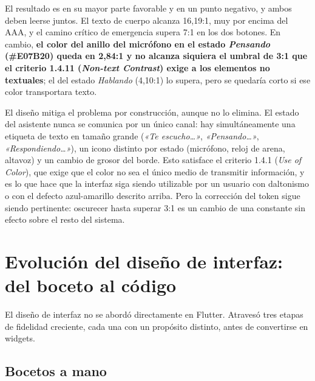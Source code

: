 El resultado es en su mayor parte favorable y en un punto negativo, y ambos deben leerse juntos. El texto
de cuerpo alcanza 16{,}19:1, muy por encima del AAA, y el camino crítico de emergencia supera 7:1 en los
dos botones. En cambio, \textbf{el color del anillo del micrófono en el estado \emph{Pensando}
(\#E07B20) queda en 2{,}84:1 y no alcanza siquiera el umbral de 3:1 que el criterio 1.4.11
(\emph{Non-text Contrast}) exige a los elementos no textuales}; el del estado \emph{Hablando} (4{,}10:1)
lo supera, pero se quedaría corto si ese color transportara texto.

El diseño mitiga el problema por construcción, aunque no lo elimina. El estado del asistente nunca se
comunica por un único canal: hay simultáneamente una etiqueta de texto en tamaño grande
(\emph{«Te escucho\ldots»}, \emph{«Pensando\ldots»}, \emph{«Respondiendo\ldots»}), un icono distinto por
estado (micrófono, reloj de arena, altavoz) y un cambio de grosor del borde. Esto satisface el criterio
1.4.1 (\emph{Use of Color}), que exige que el color no sea el único medio de transmitir información, y es
lo que hace que la interfaz siga siendo utilizable por un usuario con daltonismo o con el defecto
azul-amarillo descrito arriba. Pero la corrección del token sigue siendo pertinente: oscurecer
 hasta superar 3:1 es un cambio de una constante sin efecto sobre el resto del sistema.


\section{Evolución del diseño de interfaz: del boceto al código}
\label{sec:evolucion-diseno}

El diseño de interfaz no se abordó directamente en Flutter. Atravesó tres etapas de fidelidad creciente,
cada una con un propósito distinto, antes de convertirse en widgets.

\subsection{Bocetos a mano}

